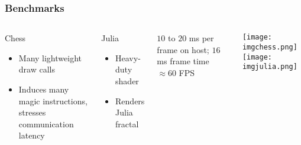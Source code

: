 \begin{frame}
\frametitle{Benchmarks}

\begin{columns}

  \begin{block}{Chess}
    \begin{itemize}
    \item Many lightweight draw calls
    \item Induces many magic instructions, stresses communication latency
    \end{itemize}
  \end{block}

  \begin{block}{Julia}
    \begin{itemize}
    \item Heavy-duty shader
    \item Renders Julia fractal
    \end{itemize}
  \end{block}

  $10$ to $20$ ms per frame on host; $16$ ms frame time $\approx60$ FPS
  

  \texttt{[image: imgchess.png]}
  \hspace{0.2cm}
  \texttt{[image: imgjulia.png]}

\end{columns}
	
\end{frame}
